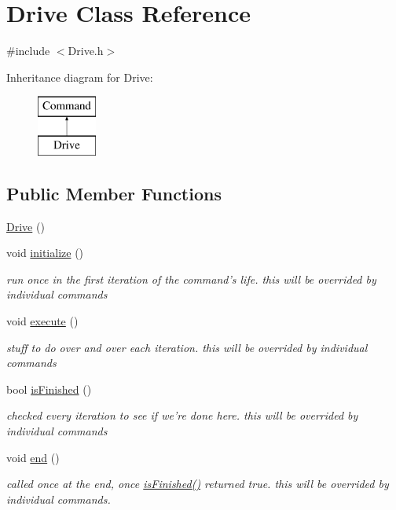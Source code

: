 \hypertarget{classDrive}{\section{Drive Class Reference}
\label{classDrive}
}


{\ttfamily \#include $<$Drive.\-h$>$}

Inheritance diagram for Drive\-:\begin{figure}[H]
\begin{center}
\leavevmode
\includegraphics[height=2.000000cm]{classDrive}
\end{center}
\end{figure}
\subsection*{Public Member Functions}
\begin{DoxyCompactItemize}
\item 
\hyperlink{classDrive_af18ec3b1c1c6603185fd4f2c9d5d6ac6}{Drive} ()
\item 
void \hyperlink{classDrive_af986858a5eebcca5a80569d7d4174c7f}{initialize} ()
\begin{DoxyCompactList}\small\item\em run once in the first iteration of the command's life. this will be overrided by individual commands \end{DoxyCompactList}\item 
void \hyperlink{classDrive_acda08e791c3016be8336a888d4baab3d}{execute} ()
\begin{DoxyCompactList}\small\item\em stuff to do over and over each iteration. this will be overrided by individual commands \end{DoxyCompactList}\item 
bool \hyperlink{classDrive_a8f75240bfe7e8ca61f48bf6c322a3e6c}{is\-Finished} ()
\begin{DoxyCompactList}\small\item\em checked every iteration to see if we're done here. this will be overrided by individual commands \end{DoxyCompactList}\item 
void \hyperlink{classDrive_aa52dc86430f29f4ddc7c6b7c35bd2232}{end} ()
\begin{DoxyCompactList}\small\item\em called once at the end, once \hyperlink{classDrive_a8f75240bfe7e8ca61f48bf6c322a3e6c}{is\-Finished()} returned true. this will be overrided by individual commands. \end{DoxyCompactList}\end{DoxyCompactItemize}
